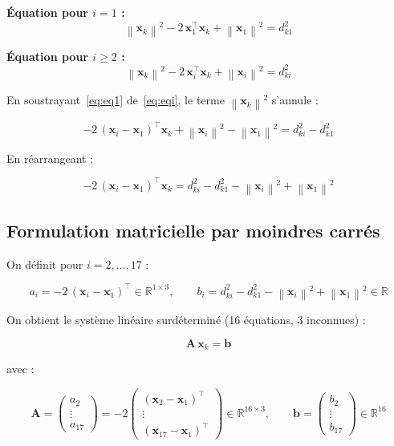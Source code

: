 \documentclass[12pt, a4paper]{article}
\theoremstyle{plain}
\theoremstyle{definition}
\newcommand{\R}{\mathbb{R}}
\newcommand{\norm}[1]{\left\lVert #1 \right\rVert}
\newcommand{\mat}[1]{\mathbf{#1}}
\newcommand{\vect}[1]{\mathbf{#1}}
\begin{document}
\textbf{Équation pour $i = 1$ :}
\begin{equation}
    \norm{\vect{x}_k}^2 - 2\,\vect{x}_1^\top\vect{x}_k + \norm{\vect{x}_1}^2
    = d_{k1}^2
    \label{eq:eq1}
\end{equation}

\textbf{Équation pour $i \geq 2$ :}
\begin{equation}
    \norm{\vect{x}_k}^2 - 2\,\vect{x}_i^\top\vect{x}_k + \norm{\vect{x}_i}^2
    = d_{ki}^2
    \label{eq:eqi}
\end{equation}

En soustrayant~\eqref{eq:eq1} de~\eqref{eq:eqi}, le terme $\norm{\vect{x}_k}^2$
s'annule :

\begin{equation}
    -2\,(\vect{x}_i - \vect{x}_1)^\top\vect{x}_k
    + \norm{\vect{x}_i}^2 - \norm{\vect{x}_1}^2
    = d_{ki}^2 - d_{k1}^2
\end{equation}

En réarrangeant :

\begin{equation}
    -2\,(\vect{x}_i - \vect{x}_1)^\top\vect{x}_k
    = d_{ki}^2 - d_{k1}^2 - \norm{\vect{x}_i}^2 + \norm{\vect{x}_1}^2
    \label{eq:linear_eq}
\end{equation}

\subsection{Formulation matricielle par moindres carrés}

On définit pour $i = 2, \ldots, 17$ :

\begin{equation}
    a_i = -2\,(\vect{x}_i - \vect{x}_1)^\top \in \R^{1\times 3},
    \qquad
    b_i = d_{ki}^2 - d_{k1}^2 - \norm{\vect{x}_i}^2 + \norm{\vect{x}_1}^2 \in \R
\end{equation}

On obtient le système linéaire surdéterminé (16 équations, 3 inconnues) :

\begin{equation}
    \mat{A}\,\vect{x}_k = \vect{b}
    \label{eq:linear_system}
\end{equation}

avec :

\begin{equation}
    \mat{A} = \begin{pmatrix} a_2 \\ \vdots \\ a_{17} \end{pmatrix}
    = -2\begin{pmatrix}
        (\vect{x}_2 - \vect{x}_1)^\top \\
        \vdots \\
        (\vect{x}_{17} - \vect{x}_1)^\top
    \end{pmatrix}
    \in \R^{16\times 3},
    \qquad
    \vect{b} = \begin{pmatrix} b_2 \\ \vdots \\ b_{17} \end{pmatrix}
    \in \R^{16}
\end{equation}
\end{document}
